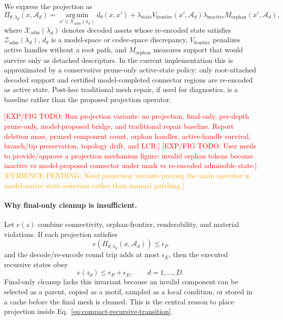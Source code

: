 \documentclass[sigconf,anonymous,review]{acmart}
\providecommand{\EvidencePending}[1]{\textcolor{orange}{[EVIDENCE PENDING: #1]}}
\providecommand{\ExpFigTODO}[1]{\textcolor{red}{[EXP/FIG TODO: #1]}}
\begin{document}
We express the projection as
\begin{equation}
\Pi_{\theta,\lambda_d}(x,\mathcal A_d)
=
\operatorname*{arg\,min}_{x'\in\mathcal X_{\mathrm{adm}}(\lambda_d)}
d_{\theta}(x,x')+
\lambda_{\mathrm{state}}V_{\mathrm{frontier}}(x',\mathcal A_d)
\lambda_{\mathrm{inactive}}M_{\mathrm{orphan}}(x',\mathcal A_d),
\end{equation}
where $\mathcal X_{\mathrm{adm}}(\lambda_d)$ denotes decoded assets whose re-encoded state satisfies $\mathcal Z_{\mathrm{adm}}(\lambda_d)$, $d_{\theta}$ is a model-space or codec-space discrepancy, $V_{\mathrm{frontier}}$ penalizes active handles without a root path, and $M_{\mathrm{orphan}}$ measures support that would survive only as detached descriptors. In the current implementation this is approximated by a conservative prune-only active-state policy: only root-attached decoded support and certified model-completed connector regions are re-encoded as active state. Post-hoc traditional mesh repair, if used for diagnostics, is a baseline rather than the proposed projection operator.

\ExpFigTODO{Run projection variants: no projection, final-only, per-depth prune-only, model-proposed bridge, and traditional repair baseline. Report deletion mass, pruned component count, orphan handles, active-handle survival, branch/tip preservation, topology drift, and LCR.}
\ExpFigTODO{User needs to provide/approve a projection mechanism figure: invalid orphan tokens become inactive vs model-proposed connector under mask vs re-encoded admissible state.}
\EvidencePending{Need projection variants proving the main operator is model-native state selection rather than manual patching.}

\paragraph{Why final-only cleanup is insufficient.}
Let $e(z)$ combine connectivity, orphan-frontier, renderability, and material violations. If each projection satisfies
\begin{equation}
e(\Pi_{\theta,\lambda_d}(x,\mathcal A_d))\le\epsilon_P
\end{equation}
and the decode/re-encode round trip adds at most $\epsilon_E$, then the executed recursive states obey
\begin{equation}
e(z_d)\le \epsilon_P+\epsilon_E,\qquad d=1,\ldots,D.
\end{equation}
Final-only cleanup lacks this invariant because an invalid component can be selected as a parent, copied as a motif, sampled as a local condition, or stored in a cache before the final mesh is cleaned. This is the central reason to place projection inside Eq.~\eqref{eq:compact-recursive-transition}.
\end{document}
